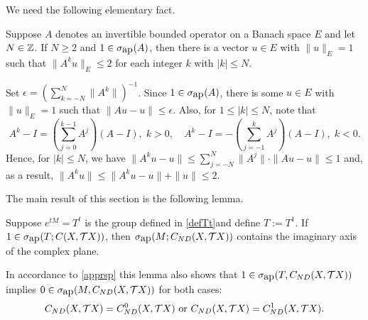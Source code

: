 We need the following elementary fact.
\begin{lem}\label{opA}
Suppose  $A$ denotes an
invertible bounded operator on a Banach space $E$ and let $N\in {\Bbb{Z}}$.
If $N\geq 2$ and
$1\in\sigma_{\mbox{ap}}(A)$, then there is a vector $u\in E$ with
$\|u\|_E=1$ such that   $\|A^ku\|_E\leq 2$ for each integer $k$ with
$|k|\leq N$.
\end{lem}
\begin{pf} Set
$\displaystyle{\epsilon=\left(\sum_{k=-N}^N\|A^k\|\right)^{-1}}$.
Since $1\in\sigma_{\mbox{ap}}(A)$, there is some
$u\in E$ with $\|u\|_E=1$ such that $\|Au-u\|\leq \epsilon$.
Also, for $1\leq |k| \leq N$, note that
$$
A^k-I=\left(\sum_{j=0}^{k-1}A^j\right)(A-I),\;
k>0,\quad
A^k-I=-\left(\sum_{j=-1}^{k}A^j\right)(A-I),\;
k<0.
$$
Hence, for $ |k|\leq N$, we have
$\displaystyle{ \|A^ku-u\|\leq
\sum_{j=-N}^N\|A^j\|\cdot \|Au-u\|
\leq 1}$
and, as a result,
$\|A^ku\|\leq
\|A^ku-u\|+\|u\|\leq 2$.
\end{pf}

The main result of this section is the following lemma.
\begin{lem}\label{main}
Suppose $e^{tM}=T^t$ is the group defined in
\eqref{defTt}and define $T:=T^1$.
If $1\in\sigma_{\mbox{ap}}(T;{C(X,{{\cal{T}}X})})$, then $\sigma_{\mbox{ap}}(M;{C_{ND}(X,{{\cal{T}}X})})$
contains the imaginary axis
of the complex plane.
\end{lem}
In accordance to \eqref{apprsp} this lemma also shows that
$1\in\sigma_{\mbox{ap}}(T,{C_{ND}(X,{{\cal{T}}X})})$ implies $0\in\sigma_{\mbox{ap}}(M,{C_{ND}(X,{{\cal{T}}X})})$
for  both cases:
\[ \CND=C_{ND}^0(X,\TX) \text{  or  }
\CND=C_{ND}^1(X,\TX).\]

